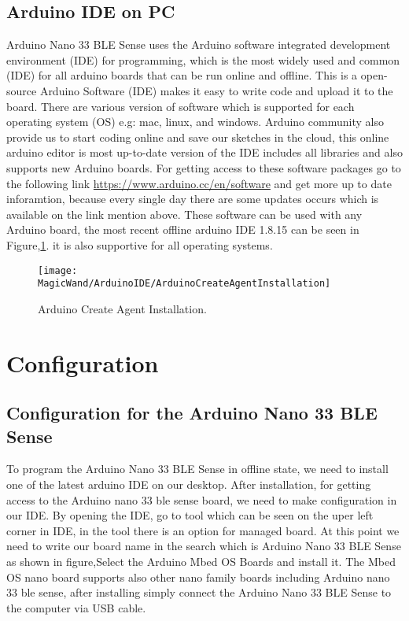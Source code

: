 \subsection{Arduino IDE on PC}

Arduino Nano 33 BLE Sense uses the Arduino software integrated development environment (IDE) for programming, which is the most widely used and common (IDE) for all arduino boards that can be run online and offline. This is a open-source Arduino Software (IDE) makes it easy to write code and upload it to the board. There are various version of software which is supported for each operating system (OS) e.g: mac, linux, and windows. Arduino community also provide us to start coding online and save our sketches in the cloud, this online arduino editor is most up-to-date version of the IDE includes all libraries and also supports new Arduino boards. For getting access to these software packages go to the following link \url{https://www.arduino.cc/en/software}  and get more up to date inforamtion, because every single day there are some updates occurs which is available on the link mention above. These software can be used with any Arduino board, the most recent offline arduino IDE 1.8.15 can be seen in Figure,\ref{fig:Arduino Creat Agent Installation}. it is also supportive for all operating systems.


\begin{figure}[H]\centering
    \texttt{[image: MagicWand/ArduinoIDE/ArduinoCreateAgentInstallation]}
    \caption{Arduino Create Agent Installation.}
    \label{fig:Arduino Creat Agent Installation}		
\end{figure}

\section{Configuration}

\subsection{Configuration for the Arduino Nano 33 BLE Sense}

To program the Arduino Nano 33 BLE Sense in offline state, we need to install one
of the latest arduino IDE on our desktop. After installation, for getting access to
the Arduino nano 33 ble sense board, we need to make configuration in our IDE. By
opening the IDE, go to tool which can be seen on the uper left corner in IDE, in the
tool there is an option for managed board. At this point we need to write our board
name in the search which is Arduino Nano 33 BLE Sense as shown in figure,Select
the Arduino Mbed OS Boards and install it. The Mbed OS nano board supports also
other nano family boards including Arduino nano 33 ble sense, after installing simply
connect the Arduino Nano 33 BLE Sense to the computer via USB cable.


